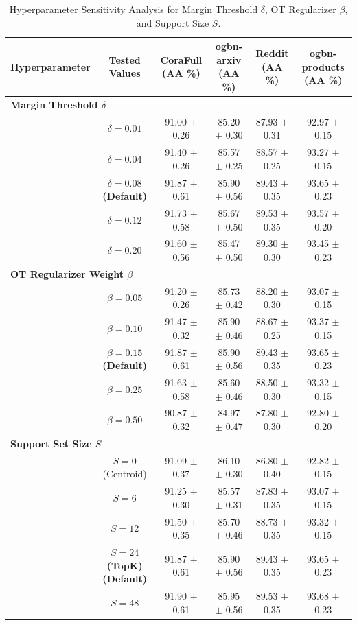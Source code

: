 \begin{table}[t]
\centering
\caption{Hyperparameter Sensitivity Analysis for Margin Threshold $\delta$, OT Regularizer $\beta$, and Support Size $S$.}
\begin{tabular}{cccccc}
\hline
\textbf{Hyperparameter} & \textbf{Tested Values} & \textbf{CoraFull (AA \%)} & \textbf{ogbn-arxiv (AA \%)} & \textbf{Reddit (AA \%)} & \textbf{ogbn-products (AA \%)} \\
\hline
\multicolumn{6}{l}{\textbf{Margin Threshold $\delta$}} \\
  & $\delta = 0.01$ & 91.00 $\pm$ 0.26 & 85.20 $\pm$ 0.30 & 87.93 $\pm$ 0.31 & 92.97 $\pm$ 0.15 \\
  & $\delta = 0.04$ & 91.40 $\pm$ 0.26 & 85.57 $\pm$ 0.25 & 88.57 $\pm$ 0.25 & 93.27 $\pm$ 0.15 \\
  & \textbf{$\delta = 0.08$ (Default)} & 91.87 $\pm$ 0.61 & 85.90 $\pm$ 0.56 & 89.43 $\pm$ 0.35 & 93.65 $\pm$ 0.23 \\
  & $\delta = 0.12$ & 91.73 $\pm$ 0.58 & 85.67 $\pm$ 0.50 & 89.53 $\pm$ 0.35 & 93.57 $\pm$ 0.20 \\
  & $\delta = 0.20$ & 91.60 $\pm$ 0.56 & 85.47 $\pm$ 0.50 & 89.30 $\pm$ 0.30 & 93.45 $\pm$ 0.23 \\
\hline
\multicolumn{6}{l}{\textbf{OT Regularizer Weight $\beta$}} \\
  & $\beta = 0.05$ & 91.20 $\pm$ 0.26 & 85.73 $\pm$ 0.42 & 88.20 $\pm$ 0.30 & 93.07 $\pm$ 0.15 \\
  & $\beta = 0.10$ & 91.47 $\pm$ 0.32 & 85.90 $\pm$ 0.46 & 88.67 $\pm$ 0.25 & 93.37 $\pm$ 0.15 \\
  & \textbf{$\beta = 0.15$ (Default)} & 91.87 $\pm$ 0.61 & 85.90 $\pm$ 0.56 & 89.43 $\pm$ 0.35 & 93.65 $\pm$ 0.23 \\
  & $\beta = 0.25$ & 91.63 $\pm$ 0.58 & 85.60 $\pm$ 0.46 & 88.50 $\pm$ 0.30 & 93.32 $\pm$ 0.15 \\
  & $\beta = 0.50$ & 90.87 $\pm$ 0.32 & 84.97 $\pm$ 0.47 & 87.80 $\pm$ 0.30 & 92.80 $\pm$ 0.20 \\
\hline
\multicolumn{6}{l}{\textbf{Support Set Size $S$}} \\
  & $S = 0$ (Centroid) & 91.09 $\pm$ 0.37 & 86.10 $\pm$ 0.30 & 86.80 $\pm$ 0.40 & 92.82 $\pm$ 0.15 \\
  & $S = 6$ & 91.25 $\pm$ 0.30 & 85.57 $\pm$ 0.31 & 87.83 $\pm$ 0.35 & 93.07 $\pm$ 0.15 \\
  & $S = 12$ & 91.50 $\pm$ 0.35 & 85.70 $\pm$ 0.46 & 88.73 $\pm$ 0.35 & 93.32 $\pm$ 0.15 \\
  & \textbf{$S = 24$ (TopK) (Default)} & 91.87 $\pm$ 0.61 & 85.90 $\pm$ 0.56 & 89.43 $\pm$ 0.35 & 93.65 $\pm$ 0.23 \\
  & $S = 48$ & 91.90 $\pm$ 0.61 & 85.95 $\pm$ 0.56 & 89.53 $\pm$ 0.35 & 93.68 $\pm$ 0.23 \\
\hline
\end{tabular}
\label{tab:hyperparameter_sensitivity}
\end{table}
